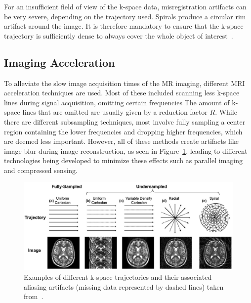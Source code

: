 \documentclass[english,version-2022-01]{uzl-thesis} %
\begin{document}
For an insufficient field of view of the k-space data, misregistration artifacts can be very severe, depending on the trajectory used. Spirals produce a circular rim artifact around the image. It is therefore mandatory to ensure that the k-space trajectory is sufficiently dense to always cover the whole object of interest~\cite{SamplingStrategies}. 

\subsection{Imaging Acceleration} \label{SubSec:ImagingAcceleration}
To alleviate the slow image acquisition times of the MR imaging, different MRI acceleration techniques are used. Most of these included scanning less k-space lines during signal acquisition, omitting certain frequencies
The amount of k-space lines that are omitted are usually given by a reduction factor $R$. While there are different subsampling techniques, most involve fully sampling a center region containing the lower frequencies and dropping higher frequencies, which are deemed less important. However, all of these methods create artifacts like image blur during image reconstruction, as seen in Figure~\ref{fig:ExamplesSubsampling}, leading to different technologies being developed to minimize these effects such as parallel imaging and compressed sensing.

\begin{figure}[htpb]
	\centering
	\graphicspath{{images/}{\main/images/}}
	\includegraphics[width=\linewidth]{ExamplesSubsampling.png} 
	\caption{Examples of different k-space trajectories and their associated aliasing artifacts (missing data represented by dashed lines) taken from~\cite{AdvancesPI}.}
	\label{fig:ExamplesSubsampling}
\end{figure}
\end{document}
